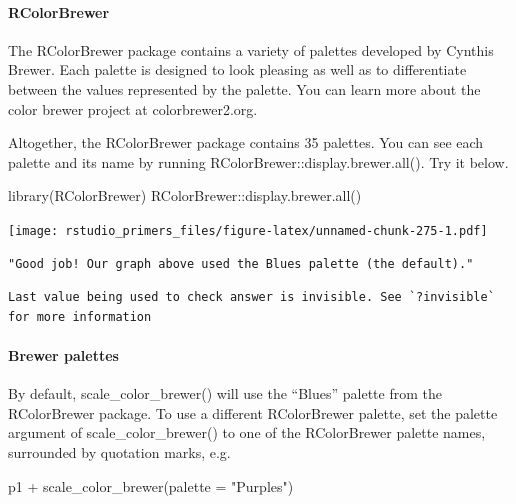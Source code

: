 \documentclass[
]{article}
\newenvironment{Shaded}{\begin{snugshade}}{\end{snugshade}}
\newcommand{\AttributeTok}[1]{\textcolor[rgb]{0.77,0.63,0.00}{#1}}
\newcommand{\FunctionTok}[1]{\textcolor[rgb]{0.00,0.00,0.00}{#1}}
\newcommand{\NormalTok}[1]{#1}
\newcommand{\SpecialCharTok}[1]{\textcolor[rgb]{0.00,0.00,0.00}{#1}}
\newcommand{\StringTok}[1]{\textcolor[rgb]{0.31,0.60,0.02}{#1}}
\begin{document}
\hypertarget{rcolorbrewer}{%
\paragraph{RColorBrewer}\label{rcolorbrewer}}

The RColorBrewer package contains a variety of palettes developed by
Cynthis Brewer. Each palette is designed to look pleasing as well as to
differentiate between the values represented by the palette. You can
learn more about the color brewer project at colorbrewer2.org.

Altogether, the RColorBrewer package contains 35 palettes. You can see
each palette and its name by running RColorBrewer::display.brewer.all().
Try it below.

\begin{Shaded}
\begin{Highlighting}[]
\FunctionTok{library}\NormalTok{(RColorBrewer)}
\NormalTok{RColorBrewer}\SpecialCharTok{::}\FunctionTok{display.brewer.all}\NormalTok{()}
\end{Highlighting}
\end{Shaded}

\texttt{[image: rstudio\_primers\_files/figure-latex/unnamed-chunk-275-1.pdf]}

\begin{verbatim}
"Good job! Our graph above used the Blues palette (the default)."
\end{verbatim}

\begin{verbatim}
Last value being used to check answer is invisible. See `?invisible` for more information
\end{verbatim}

\hypertarget{brewer-palettes}{%
\paragraph{Brewer palettes}\label{brewer-palettes}}

By default, scale\_color\_brewer() will use the ``Blues'' palette from
the RColorBrewer package. To use a different RColorBrewer palette, set
the palette argument of scale\_color\_brewer() to one of the
RColorBrewer palette names, surrounded by quotation marks, e.g.

\begin{Shaded}
\begin{Highlighting}[]
\NormalTok{p1 }\SpecialCharTok{+} \FunctionTok{scale\_color\_brewer}\NormalTok{(}\AttributeTok{palette =} \StringTok{"Purples"}\NormalTok{)}
\end{Highlighting}
\end{Shaded}
\end{document}
